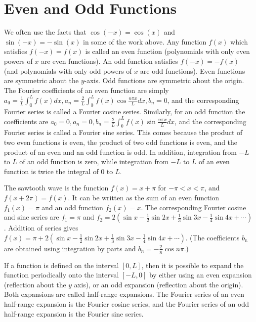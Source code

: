 {\section{Even and Odd Functions}
We often use the facts that $\cos(-x)=\cos(x)$ and $\sin(-x)=-\sin(x)$ in some of the work above.  Any function $f(x)$ which satisfies $f(-x)=f(x)$ is called an even function (polynomials with only even powers of $x$ are even functions).  An odd function satisfies $f(-x)=-f(x)$ (and polynomials with only odd powers of $x$ are odd functions).  Even functions are symmetric about the $y$-axis. Odd functions are symmetric about the origin.  The Fourier coefficients of an even function are simply $a_0=\frac{1}{L}\int_0^L f(x)dx, a_n=\frac{2}{L}\int_0^L f(x)\cos \frac{n\pi x}{L}dx, b_n=0$, and the corresponding Fourier series is called a Fourier cosine series.  Similarly, for an odd function the coefficients are $a_0=0, a_n=0, b_n=\frac{2}{L}\int_0^L f(x)\sin \frac{n\pi x}{L}dx$, and the corresponding Fourier series is called a Fourier sine series. This comes because the product of two even functions is even, the product of two odd functions is even, and the product of an even and an odd function is odd. In addition, integration from $-L$ to $L$ of an odd function is zero, while integration from $-L$ to $L$ of an even function is twice the integral of $0$ to $L$.

The sawtooth wave is the function $f(x) = x+\pi$ for $-\pi<x<\pi$, and $f(x+2\pi)=f(x)$.  It can be written as the sum of an even function $f_1(x)=\pi$ and an odd function $f_2(x)=x$.  The corresponding Fourier cosine and sine series are $f_1=\pi$ and $f_2=2\left(\sin x -\frac{1}{2}\sin 2x +\frac{1}{3}\sin 3x -\frac{1}{4}\sin 4x+\cdots\right)$. Addition of series gives $f(x) = \pi+ 2\left(\sin x -\frac{1}{2}\sin 2x +\frac{1}{3}\sin 3x -\frac{1}{4}\sin 4x+\cdots\right)$. (The coefficients $b_n$ are obtained using integration by parts and $b_n = -\frac{2}{n}\cos n\pi$.)

If a function is defined on the interval $[0,L]$, then it is possible to expand the function periodically onto the interval $[-L,0]$ by either using an even expansion (reflection about the $y$ axis), or an odd expansion (reflection about the origin). Both expansions are called half-range expansions.  The Fourier series of an even half-range expansion is the Fourier cosine series, and the Fourier series of an odd half-range expansion is the Fourier sine series.  

}
